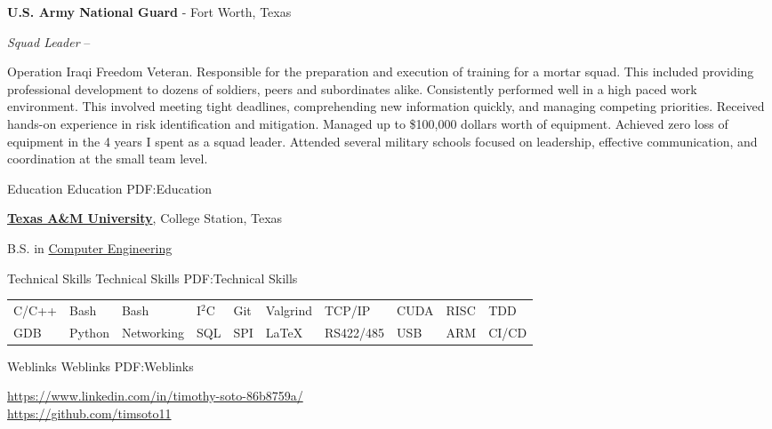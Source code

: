 \documentclass[letterpaper,MMMyyyy,nonstopmode]{simpleresumecv}
\begin{document}
\begin{Body}
    \vspace{3mm}
    \pagebreak
    {\textbf{U.S. Army National Guard}}
    - Fort Worth, Texas

        {\textit{Squad Leader}}
    \hfill
     --
    \begin{Detail}
        \BulletItem
        Operation Iraqi Freedom Veteran.
        \vspace{2mm}
        \BulletItem
        Responsible for the preparation and execution of training for a mortar squad. This included providing professional development to dozens of soldiers, peers and subordinates alike.
        \vspace{2mm}
        \BulletItem
        Consistently performed well in a high paced work environment. This involved meeting tight deadlines, comprehending new information quickly, and managing competing priorities.
        \vspace{2mm}
        \BulletItem
        Received hands-on experience in risk identification and mitigation.
        \vspace{2mm}
        \BulletItem
        Managed up to \$100,000 dollars worth of equipment. Achieved zero loss of equipment in the 4 years I spent as a squad leader.
        \vspace{2mm}
        \BulletItem
        Attended several military schools focused on leadership, effective communication, and coordination at the small team level.
        \vspace{2mm}
    \end{Detail}
    \BigGap

    \Section
    {Education}
    {Education}
    {PDF:Education}

    \Entry
    \href{http://www.tamu.edu}
    {\textbf{Texas A\&M University}},
    College Station, Texas

    B.S. in
    \href{https://engineering.tamu.edu/cse/index.html}
    {Computer Engineering}
    \hfill


    \Section
    {Technical Skills}
    {Technical Skills}
    {PDF:Technical Skills}

    \noindent\begin{tabular}[t]{@{}llllllllll}
        C/C++ & Bash   & Bash       & I$^{2}$C & Git & Valgrind & TCP/IP    & CUDA & RISC & TDD   \\
        GDB   & Python & Networking & SQL      & SPI & {\LaTeX} & RS422/485 & USB  & ARM  & CI/CD
    \end{tabular}


    \Section
    {Weblinks}
    {Weblinks}
    {PDF:Weblinks}

    \href{https://www.linkedin.com/in/timothy-soto-86b8759a/}
    {https://www.linkedin.com/in/timothy-soto-86b8759a/} \\
    \href{https://github.com/timsoto11}
    {https://github.com/timsoto11}
\end{Body}
\end{document}
